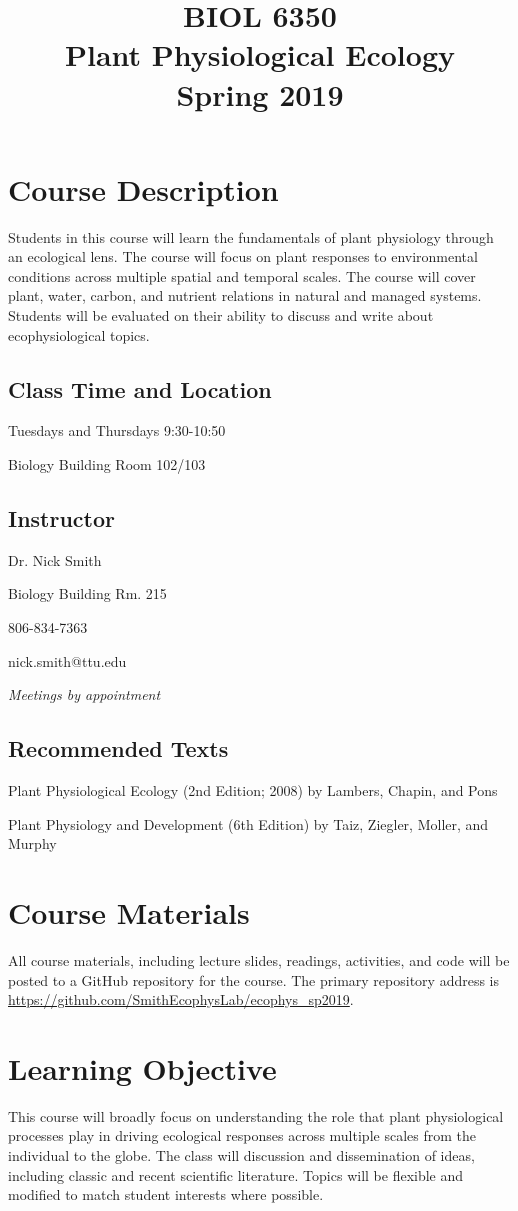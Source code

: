 \documentclass[12pt, notitlepage]{article}   	%
\title{
	\textbf{
		BIOL 6350
	} \\
	\large Plant Physiological Ecology \\
	\large Spring 2019
}
\date{\vspace{-5ex}}
\begin{document}
\maketitle

\section{Course Description}
Students in this course will learn the fundamentals of plant physiology through 
an ecological lens. The course will focus on plant responses to environmental conditions 
across multiple spatial and temporal scales. The course will cover plant, water, carbon, 
and nutrient relations in natural and managed systems. Students will be evaluated on their 
ability to discuss and write about ecophysiological topics.

\subsection{Class Time and Location}
Tuesdays and Thursdays 9:30-10:50

Biology Building Room 102/103

\subsection{Instructor}
Dr. Nick Smith \par
Biology Building Rm. 215 \par
806-834-7363 \par
nick.smith@ttu.edu \par
\textit{Meetings by appointment}

\subsection{Recommended Texts}
Plant Physiological Ecology (2nd Edition; 2008) by Lambers, Chapin, and Pons \par
Plant Physiology and Development (6th Edition) by Taiz, Ziegler, Moller, and Murphy

\section{Course Materials}
All course materials, including lecture slides, readings, activities, and code 
will be posted to a GitHub repository for the course.
The primary repository address is
\url{https://github.com/SmithEcophysLab/ecophys_sp2019}.

\section{Learning Objective}
This course will broadly focus on understanding the role that plant physiological 
processes play in driving ecological responses across multiple scales from the individual 
to the globe. The class will discussion and dissemination of ideas, including classic and 
recent scientific literature. Topics will be flexible and modified to match student 
interests where possible.
\end{document}
